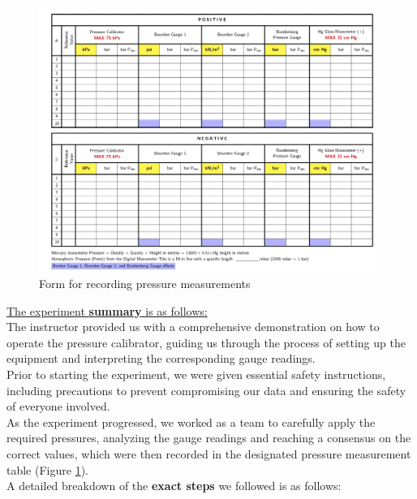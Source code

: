 \documentclass{article}
\begin{document}
	\begin{figure}[H] 
			\centering 
			\includegraphics[width=1\textwidth,cfbox=gray!15 1pt]{images/tableland-1_page-0001.jpg} 
			\caption{Form for recording pressure measurements} 
			\label{fig:pressurestable} 
	\end{figure}
	\underline{The experiment \textbf{summary} is as follows:}\\[1em]
	The instructor provided us with a comprehensive demonstration on how to operate the pressure calibrator, guiding us through the process of setting up the equipment and interpreting the corresponding gauge readings.\\[1em]
	Prior to starting the experiment, we were given essential safety instructions, including precautions to prevent compromising our data and ensuring the safety of everyone involved.\\[1em]
	As the experiment progressed, we worked as a team to carefully apply the required pressures, analyzing the gauge readings and reaching a consensus on the correct values, which were then recorded in the designated pressure measurement table (Figure \ref{fig:pressurestable}).\\[1em]
	A detailed breakdown of the \textbf{exact steps} we followed is as follows:
\newpage{}
\end{document}
